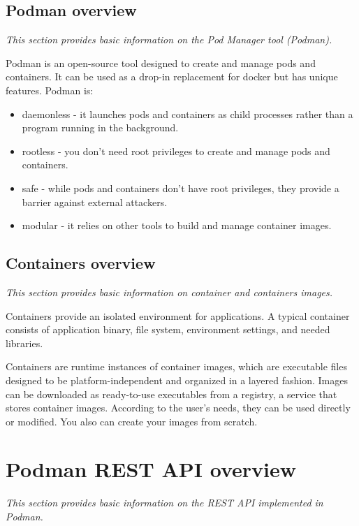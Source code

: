\documentclass[11pt]{article}
\newenvironment{mditemize}%
    {\begin{itemize}
        \setlength{\parskip}{0.5\smallskipamount}}%
    {\end{itemize}}
\begin{document}
\hypertarget{podman-overview}{%
\subsection{Podman overview}\label{podman-overview}}
 \textit{This section provides basic information on the Pod Manager tool (Podman).}

Podman is an open-source tool designed to create and manage pods and containers. It can be used as a drop-in replacement for docker but has unique features. Podman is:
\begin{mditemize}
 \item daemonless - it launches pods and containers as child processes rather than a program running in the background.
\item rootless - you don’t need root privileges to create and manage pods and containers.
\item safe - while pods and containers don’t have root privileges, they provide a barrier against external attackers.
\item modular - it relies on other tools to build and manage container images.
\end{mditemize}

\hypertarget{container-overview}{%
\subsection{Containers overview}\label{container-overview}}
 \textit{This section provides basic information on container and containers images.}

Containers provide an isolated environment for applications. A typical container consists of application binary, file system, environment settings, and needed libraries. 

Containers are runtime instances of container images, which are executable files designed to be platform-independent and organized in a layered fashion. Images can be downloaded as ready-to-use executables from a registry, a service that stores container images. According to the user's needs, they can be used directly or modified. You also can create your images from scratch.
 

\hypertarget{api-overview}{%
\section{Podman REST API overview}\label{api-overview}}
 \textit{This section provides basic information on the REST API implemented in  Podman.}
\end{document}
